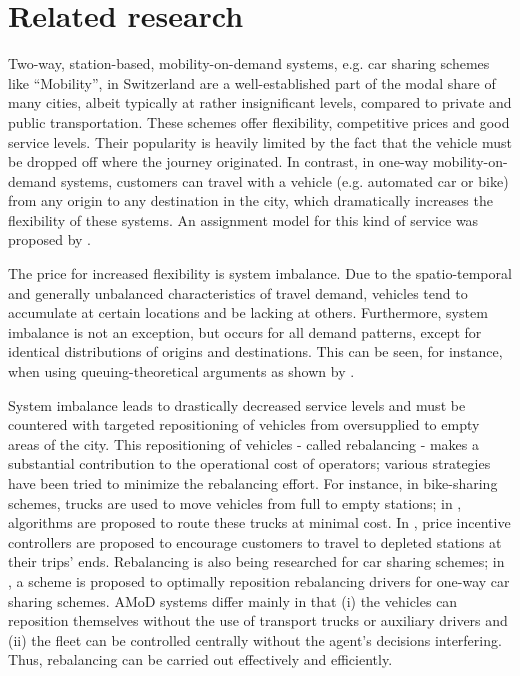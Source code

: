 \section{Related research}
\label{subs:literatureResearch}

Two-way, station-based, mobility-on-demand systems, e.g. car sharing schemes like ``Mobility'', in Switzerland \citep{katzev2003car} are a well-established part of the modal share of many cities, albeit typically at rather insignificant levels, compared to private and public transportation. These schemes offer flexibility, competitive prices and good service levels. Their popularity is heavily limited by the fact that the vehicle must be dropped off where the journey originated. In contrast, in one-way mobility-on-demand systems, customers can travel with a vehicle (e.g. automated car or bike) from any origin to any destination in the city, which dramatically increases the flexibility of these systems. An assignment model for this kind of service was proposed by \citet{katzev2003car}.


The price for increased flexibility is system imbalance. Due to the spatio-temporal and generally unbalanced characteristics of travel demand, vehicles tend to accumulate at certain locations and be lacking at others. Furthermore, system imbalance is not an exception, but occurs for all demand patterns, except for identical distributions of origins and destinations. This can be seen, for instance, when using queuing-theoretical arguments as shown by \citet{zhang2016control}.


System imbalance leads to drastically decreased service levels and must be countered with targeted repositioning of vehicles from oversupplied to empty areas of the city. This repositioning of vehicles - called rebalancing - makes a substantial contribution to the operational cost of operators; various strategies have been tried to minimize the rebalancing effort. For instance, in bike-sharing schemes, trucks are used to move vehicles from full to empty stations; in \citep{pfrommer2014dynamic}, algorithms are proposed to route these trucks at minimal cost. In \citep{ruch2014rule}, price incentive controllers are proposed to encourage customers to travel to depleted stations at their trips' ends. Rebalancing is also being researched for car sharing schemes; in \citep{smith2013rebalancing}, a scheme is proposed to optimally reposition rebalancing drivers for one-way car sharing schemes. AMoD systems differ mainly in that (i) the vehicles can reposition themselves without the use of transport trucks or auxiliary drivers and (ii) the fleet can be controlled centrally without the agent's decisions interfering. Thus, rebalancing can be carried out effectively and efficiently.


